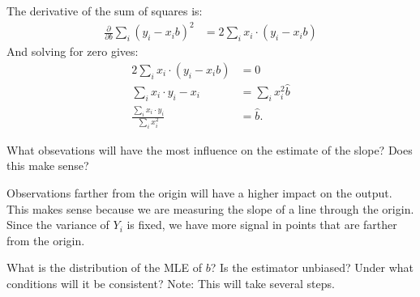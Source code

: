 The derivative of the sum of squares is:
\begin{align*}
\frac{\partial}{\partial b} \sum_i (y_i - x_i b)^2 &= 2 \sum_i x_i \cdot (y_i - x_i b)
\end{align*}
And solving for zero gives:
\begin{align*}
2 \sum_i x_i \cdot (y_i - x_i b) &= 0\\
\sum_i x_i \cdot y_i - x_i &= \sum_i x_i^2 \widehat{b} \\
\frac{\sum_i x_i \cdot y_i}{\sum_i x_i^2} &= \widehat{b}.
\end{align*}


What obsevations will have the most influence on the estimate of the slope?
Does this make sense?


Observations farther from the origin will have a higher impact on the output.
This makes sense because we are measuring the slope of a line through the origin.
Since the variance of $Y_i$ is fixed, we have more signal in points that are 
farther from the origin.


What is the distribution of the MLE of $b$? Is the estimator unbiased? Under
what conditions will it be consistent? Note: This will take several steps.


